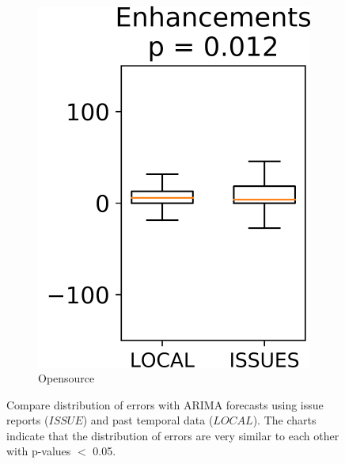 \begin{figure}[tb!]
\begin{subfigure}[t]{0.49\linewidth}
		\includegraphics[width=0.475\linewidth]{images/RQ4/opensrc/Enhancements.png}
		\caption{Opensource}
	\end{subfigure}%
	\caption{Compare distribution of errors with ARIMA forecasts using issue reports ($\mathit{ISSUE}$) and past temporal data ($\mathit{LOCAL}$). The charts indicate that the distribution of errors are very similar to each other with p-values $<$ 0.05.}
	\label{fig:rq4}
\end{figure}
